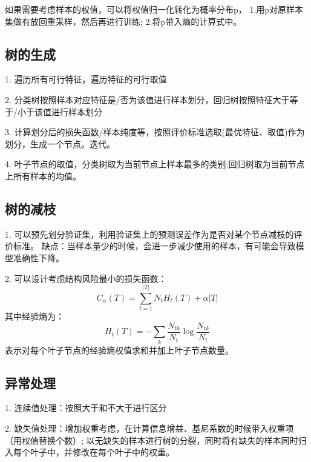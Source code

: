 如果需要考虑样本的权值，可以将权值归一化转化为概率分布p，
1.用p对原样本集做有放回重采样，然后再进行训练; 
2.将p带入熵的计算式中。


\subsection{树的生成}
1. 遍历所有可行特征，遍历特征的可行取值

2. 分类树按照样本对应特征是/否为该值进行样本划分，回归树按照特征大于等于/小于该值进行样本划分

3. 计算划分后的损失函数/样本纯度等，按照评价标准选取(最优特征、取值)作为划分，生成一个节点。迭代。

4. 叶子节点的取值，分类树取为当前节点上样本最多的类别;回归树取为当前节点上所有样本的均值。

\subsection{树的减枝}
1. 可以预先划分验证集，利用验证集上的预测误差作为是否对某个节点减枝的评价标准。
缺点：当样本量少的时候，会进一步减少使用的样本，有可能会导致模型准确性下降。

2. 可以设计考虑结构风险最小的损失函数：
\begin{equation*}
    C_\alpha(T) = \sum_{t=1}^{|T|}N_t H_t(T) + \alpha |T|
\end{equation*}
其中经验熵为：
\begin{equation*}
    H_t(T) = -\sum_k \frac{N_{tk}}{N_t}\log\frac{N_{tk}}{N_t}
\end{equation*}
表示对每个叶子节点的经验熵权值求和并加上叶子节点数量。

\subsection{异常处理}
1. 连续值处理：按照大于和不大于进行区分

2. 缺失值处理：增加权重考虑，在计算信息增益、基尼系数的时候带入权重项（用权值替换个数）;
以无缺失的样本进行树的分裂，同时将有缺失的样本同时归入每个叶子中，并修改在每个叶子中的权重。

